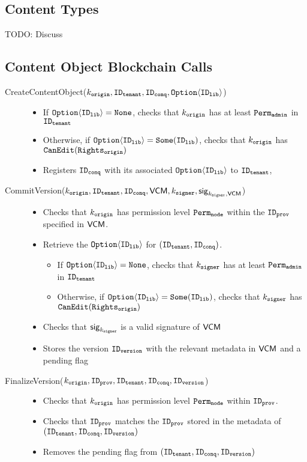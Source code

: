 \subsection{Content Types}
TODO: Discuss

\subsection{Content Object Blockchain Calls}

\begin{description}
  \item[CreateContentObject($k_\mathtt{origin}, \mathtt{ID_{tenant}}, \mathtt{ID_{conq}}, \mathtt{Option\langle}\mathtt{ID_{lib}}\mathtt{\rangle}$)] \phantom{}
    \begin{itemize}
      \item If $\mathtt{Option\langle}\mathtt{ID_{lib}}\mathtt{\rangle} = \mathtt{None}$, checks that $k_\mathtt{origin}$ has at least $\mathtt{Perm_{admin}}$ in $\mathtt{ID_{tenant}}$
      \item Otherwise, if $\mathtt{Option\langle}\mathtt{ID_{lib}}\mathtt{\rangle} = \mathtt{Some(}{\mathtt{ID_{lib}}}\mathtt{)}$, checks that $k_\mathtt{origin}$ has $\mathtt{CanEdit}(\mathtt{Rights_{origin}})$
      \item Registers $\mathtt{ID_{conq}}$ with its associated $\mathtt{Option\langle}\mathtt{ID_{lib}}\mathtt{\rangle}$ to $\mathtt{ID_{tenant}}$, 
    \end{itemize}

  \item[CommitVersion($k_\mathtt{origin}, \mathtt{ID_{tenant}}, \mathtt{ID_{conq}}, \mathsf{VCM}, k_\mathtt{signer}, \mathsf{sig}_{k_\mathtt{signer}, \mathsf{VCM}}$)] \phantom{}
    \begin{itemize}
      \item Checks that $k_\mathtt{origin}$ has permission level $\mathtt{Perm_{node}}$ within the $\mathtt{ID_{prov}}$ specified in $\mathsf{VCM}$.
      \item Retrieve the $\mathtt{Option\langle}\mathtt{ID_{lib}}\mathtt{\rangle}$ for $(\mathtt{ID_{tenant}}, \mathtt{ID_{conq}})$.
        \begin{itemize}
          \item If $\mathtt{Option\langle}\mathtt{ID_{lib}}\mathtt{\rangle} = \mathtt{None}$, checks that $k_\mathtt{signer}$ has at least \newline $\mathtt{Perm_{admin}}$ in $\mathtt{ID_{tenant}}$
          \item Otherwise, if $\mathtt{Option\langle}\mathtt{ID_{lib}}\mathtt{\rangle} = \mathtt{Some(}{\mathtt{ID_{lib}}}\mathtt{)}$, checks that $k_\mathtt{signer}$ has $\mathtt{CanEdit}(\mathtt{Rights_{origin}})$
        \end{itemize}
      \item Checks that $\mathsf{sig}_{k_\mathtt{signer}}$ is a valid signature of $\mathsf{VCM}$
      \item Stores the version $\mathtt{ID_{version}}$ with the relevant metadata in $\mathsf{VCM}$ and a pending flag
    \end{itemize}

  \item[FinalizeVersion($k_\mathtt{origin}, \mathtt{ID_{prov}}, \mathtt{ID_{tenant}}, \mathtt{ID_{conq}}, \mathtt{ID_{version}}$)] \phantom{}
    \begin{itemize}
      \item Checks that $k_\mathtt{origin}$ has permission level $\mathtt{Perm_{node}}$ within $\mathtt{ID_{prov}}$.
      \item Checks that $\mathtt{ID_{prov}}$ matches the $\mathtt{ID_{prov}}$ stored in the metadata of $(\mathtt{ID_{tenant}}, \mathtt{ID_{conq}}, \mathtt{ID_{version}})$
      \item Removes the pending flag from $(\mathtt{ID_{tenant}}, \mathtt{ID_{conq}}, \mathtt{ID_{version}})$
    \end{itemize}
\end{description}
